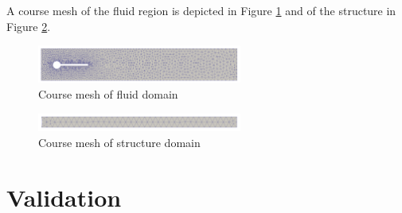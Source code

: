 \documentclass{article}
\begin{document}
A course mesh of the fluid region is depicted in Figure \ref{fig:mesh_fluid} and of the structure in Figure \ref{fig:mesh_structure}. 

\FloatBarrier
\begin{figure}[h]
\centering
	\includegraphics[width=0.6\textwidth]{mesh_fluid}
	\caption{Course mesh of fluid domain}
	\label{fig:mesh_fluid}
\end{figure}
\FloatBarrier

\FloatBarrier
\begin{figure}[h]
\centering
	\includegraphics[width=0.6\textwidth]{mesh_structure}
	\caption{Course mesh of structure domain}
	\label{fig:mesh_structure}
\end{figure}
\FloatBarrier

\section{Validation} 






{}

\end{document}
